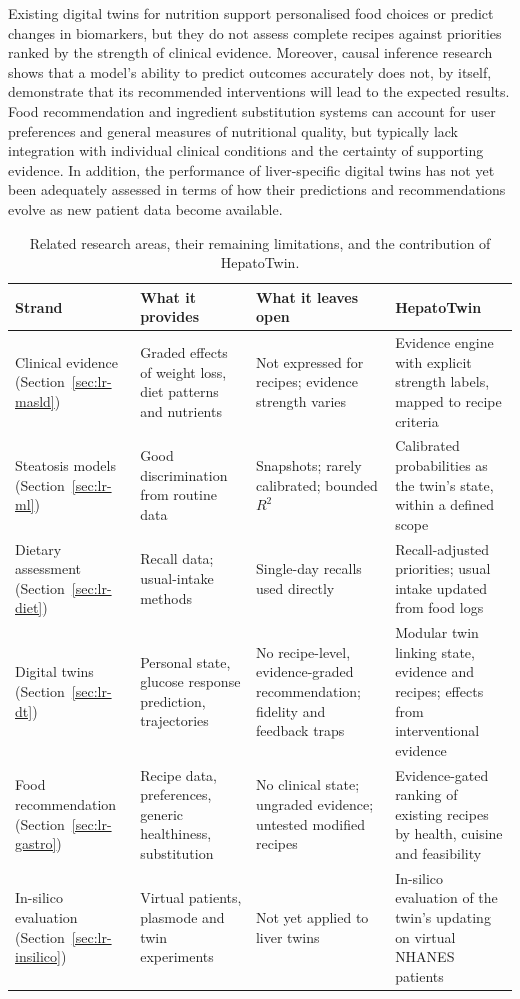Existing digital twins for nutrition support personalised food choices or predict changes in biomarkers, but they do not assess complete recipes against priorities ranked by the strength of clinical evidence. Moreover, causal inference research shows that a model's ability to predict outcomes accurately does not, by itself, demonstrate that its recommended interventions will lead to the expected results. Food recommendation and ingredient substitution systems can account for user preferences and general measures of nutritional quality, but typically lack integration with individual clinical conditions and the certainty of supporting evidence. In addition, the performance of liver-specific digital twins has not yet been adequately assessed in terms of how their predictions and recommendations evolve as new patient data become available.

\begin{table}[t]
\centering
\small
\caption{Related research areas, their remaining limitations, and the contribution of HepatoTwin.}
\label{tab:gap}
\begin{tabularx}{\textwidth}{@{}>{\raggedright\arraybackslash}p{2.5cm} Y Y Y@{}}
\toprule
Strand & What it provides & What it leaves open & HepatoTwin \\
\midrule
Clinical evidence (Section~\ref{sec:lr-masld}) & Graded effects of weight loss, diet patterns and nutrients & Not expressed for recipes; evidence strength varies & Evidence engine with explicit strength labels, mapped to recipe criteria \\
Steatosis models (Section~\ref{sec:lr-ml}) & Good discrimination from routine data & Snapshots; rarely calibrated; bounded $R^2$ & Calibrated probabilities as the twin's state, within a defined scope \\
Dietary assessment (Section~\ref{sec:lr-diet}) & Recall data; usual-intake methods & Single-day recalls used directly & Recall-adjusted priorities; usual intake updated from food logs \\
Digital twins (Section~\ref{sec:lr-dt}) & Personal state, glucose response prediction, trajectories & No recipe-level, evidence-graded recommendation; fidelity and feedback traps & Modular twin linking state, evidence and recipes; effects from interventional evidence \\
Food recommendation (Section~\ref{sec:lr-gastro}) & Recipe data, preferences, generic healthiness, substitution & No clinical state; ungraded evidence; untested modified recipes & Evidence-gated ranking of existing recipes by health, cuisine and feasibility \\
In-silico evaluation (Section~\ref{sec:lr-insilico}) & Virtual patients, plasmode and twin experiments & Not yet applied to liver twins & In-silico evaluation of the twin's updating on virtual NHANES patients \\
\bottomrule
\end{tabularx}
\end{table}

